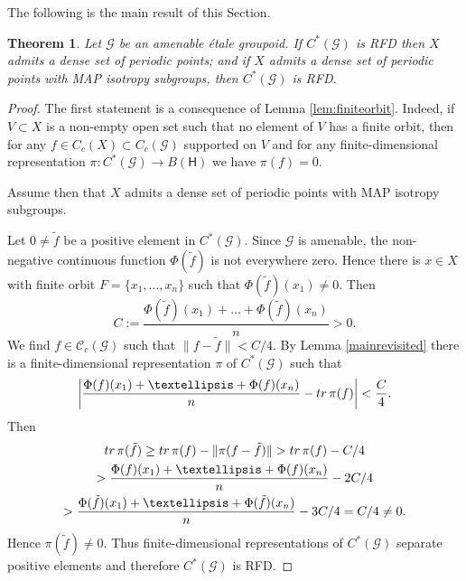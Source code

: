 \documentclass[11 pt, leqno, hidelinks]{amsart}%
\newtheorem{theorem}{Theorem}[section]
\theoremstyle{plain}
\numberwithin{equation}{section}
\newcommand{\GG}{\mathcal{G}}
\newcommand{\tr}{\textup{tr}}
\newcommand{\Hil}{\mathsf{H}}
\begin{document}
The following is the main result of this Section.

\begin{theorem}\label{theorem:main}
	Let $\GG$ be an amenable \'etale groupoid.
	If  $C^*(\GG)$ is RFD then $X$ admits a dense set of periodic points; and if $X$ admits a dense set of periodic points with MAP isotropy subgroups, then $C^*(\GG)$ is RFD.
\end{theorem}
\begin{proof}
	The first statement is a consequence of Lemma \ref{lem:finiteorbit}. Indeed, if $V\subset X$ is a non-empty open set such that no element of $V$ has a finite orbit, then for any $f \in C_c(X)\subset C_c(\GG)$ supported on $V$ and for any finite-dimensional representation $\pi:C^*(\GG) \to B(\Hil)$ we have $\pi(f)=0$.
	
	Assume then that $X$ admits a dense set of periodic points with MAP isotropy subgroups.

	

	
	 Let $0\neq \tilde{f}$ be a positive element in $C^*(\GG)$. Since $\GG$ is amenable, the non-negative continuous function $\Phi(\tilde{f})$ is  not everywhere zero. Hence there is $x\in X$ with finite orbit $F=\{x_1, \ldots,x_n\}$ such that $\Phi(\tilde{f})(x_1)\neq 0$. Then
	$$C:= \frac{\Phi(\tilde{f})(x_1) +\ldots + \Phi(\tilde{f})(x_n)}{n}>0.$$
	We find $f\in \mathcal C_c(\GG)$ such that $\|f - \tilde{f}\|<C/4.$  By Lemma \ref{mainrevisited} there is a finite-dimensional representation $\pi$ of $C^*(\GG)$ such that
$$\left| \frac{\Phi(f)(x_1)+\ldots +\Phi(f)(x_n)}{n} - \tr\, \pi(f)\right|<\frac{C}{4}.$$
	Then \begin{multline*} \tr \, \pi(\tilde{f}) \ge \tr\, \pi(f) - \|\pi(f- \tilde{f})\| > \tr\, \pi(f) - C/4\\
	>\frac{\Phi(f)(x_1)+\ldots +\Phi(f)(x_n)}{n}  -2C/4\\ > \frac{\Phi(\tilde{f})(x_1)+\ldots +\Phi(\tilde{f})(x_n)}{n}  -3C/4= C/4 \neq 0.
	\end{multline*}
	Hence $\pi(\tilde{f})\neq 0$. Thus finite-dimensional representations of $C^*(\GG)$  separate positive elements and therefore $C^*(\GG)$  is RFD.
\end{proof}
\end{document}
